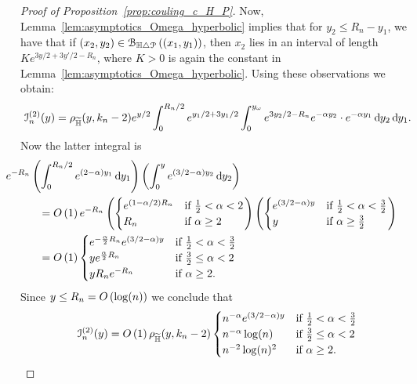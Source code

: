 \begin{proof}[Proof of Proposition~\ref{prop:couling_c_H_P}]
Now, Lemma~\ref{lem:asymptotics_Omega_hyperbolic} implies that for 
$y_2 \leq R_n -y_1$, we have that if 
$(x_2,y_2) \in {\mathcal B}_{\mathbb{H} \bigtriangleup {\mathcal P}}\left((x_1,y_1)\right)$, then $x_2$ lies in an interval of length 
$Ke^{3 y/2 + 3y'/2 - R_n}$, where $K >0$ is again the constant in Lemma~\ref{lem:asymptotics_Omega_hyperbolic}. 
Using these observations we obtain: 
\begin{equation} \label{eq:term2_intermediate}
	\mathcal{I}_n^{(2)}(y) = \rho_{\widetilde{\mathbb{H}}}(y,k_n-2) e^{y/2}\int_0^{R_n/2} e^{y_1/2 + 3y_1/2}
	\int_0^{y_\omega} e^{3y_2/2 - R_n} e^{-\alpha y_2} \cdot e^{-\alpha y_1} \operatorname{\mathrm{d}\hspace{-2pt}} y_2 \operatorname{\mathrm{d}\hspace{-2pt}} y_1. 
\end{equation} 
Now the latter integral is
\begin{align*}
	&\hspace{-30pt} e^{-R_n}  \left(\int_0^{R_n/2} e^{(2-\alpha )y_1} \dd y_1\right) 
		\left( \int_0^{y} e^{(3/2 - \alpha) y_2} \dd y_2 \right)\\
	&= \bigO{1} e^{-R_n} \left(\begin{cases}
		e^{(1-\alpha/2)R_n} &\mbox{if } \frac{1}{2} < \alpha < 2\\
		R_n &\mbox{if } \alpha \ge 2
	\end{cases}\right)
	\left(\begin{cases}
		e^{(3/2 - \alpha)y} &\mbox{if } \frac{1}{2} < \alpha < \frac{3}{2}\\
		y &\mbox{if } \alpha \ge \frac{3}{2}
	\end{cases}\right)\\
	&= \bigO{1} \begin{cases}
		e^{-\frac{\alpha}{2}R_n} e^{(3/2 - \alpha)y} &\mbox{if } \frac{1}{2} < \alpha < \frac{3}{2}\\
		y e^{\frac{\alpha}{2} R_n} &\mbox{if } \frac{3}{2} \le \alpha < 2\\
		y R_n e^{-R_n} &\mbox{if } \alpha \ge 2.
	\end{cases} 
\end{align*}
Since $y \le R_n = O\left(\log(n)\right)$ we conclude that
\[
	\mathcal{I}_n^{(2)}(y) = O\left(1\right) \rho_{\widetilde{\mathbb{H}}}(y,k_n-2) \begin{cases}
		n^{-\alpha} e^{(3/2 - \alpha) y} &\mbox{if } \frac{1}{2} < \alpha < \frac{3}{2}\\
		n^{-\alpha} \log(n) &\mbox{if } \frac{3}{2} \le \alpha < 2\\
		n^{-2} \log(n)^{2} &\mbox{if } \alpha \ge 2.
	\end{cases} 	
\]


\end{proof}
